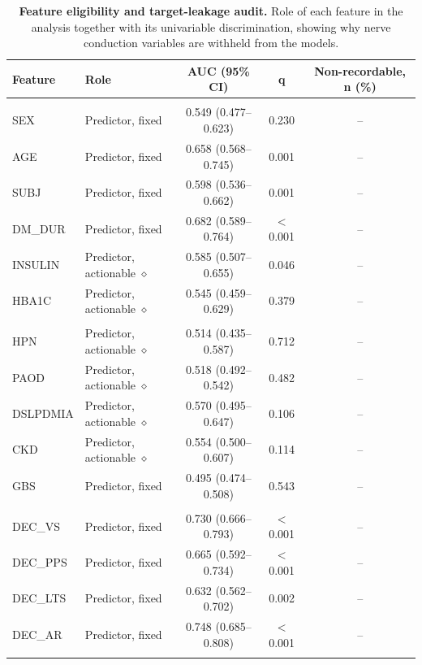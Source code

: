 \begin{table}[!ht]
\centering
\footnotesize
\caption{\textbf{Feature eligibility and target-leakage audit.} Role of each feature in the analysis together with its univariable discrimination, showing why nerve conduction variables are withheld from the models.}
\label{tab:eligibility}
\begin{tabular}{llccc}
\toprule
\textbf{Feature} & \textbf{Role} & \textbf{AUC (95\% CI)} & \textbf{q} & \textbf{Non-recordable, n (\%)} \\
\midrule
\addlinespace
\multicolumn{5}{l}{\textit{Profile}} \\
SEX & Predictor, fixed & 0.549 (0.477--0.623) & 0.230 & -- \\
AGE & Predictor, fixed & 0.658 (0.568--0.745) & 0.001 & -- \\
SUBJ & Predictor, fixed & 0.598 (0.536--0.662) & 0.001 & -- \\
DM\_DUR & Predictor, fixed & 0.682 (0.589--0.764) & $<$0.001 & -- \\
INSULIN & Predictor, actionable $\diamond$ & 0.585 (0.507--0.655) & 0.046 & -- \\
HBA1C & Predictor, actionable $\diamond$ & 0.545 (0.459--0.629) & 0.379 & -- \\
\addlinespace
\multicolumn{5}{l}{\textit{Comorbidity}} \\
HPN & Predictor, actionable $\diamond$ & 0.514 (0.435--0.587) & 0.712 & -- \\
PAOD & Predictor, actionable $\diamond$ & 0.518 (0.492--0.542) & 0.482 & -- \\
DSLPDMIA & Predictor, actionable $\diamond$ & 0.570 (0.495--0.647) & 0.106 & -- \\
CKD & Predictor, actionable $\diamond$ & 0.554 (0.500--0.607) & 0.114 & -- \\
GBS & Predictor, fixed & 0.495 (0.474--0.508) & 0.543 & -- \\
\addlinespace
\multicolumn{5}{l}{\textit{Neurological examination}} \\
DEC\_VS & Predictor, fixed & 0.730 (0.666--0.793) & $<$0.001 & -- \\
DEC\_PPS & Predictor, fixed & 0.665 (0.592--0.734) & $<$0.001 & -- \\
DEC\_LTS & Predictor, fixed & 0.632 (0.562--0.702) & 0.002 & -- \\
DEC\_AR & Predictor, fixed & 0.748 (0.685--0.808) & $<$0.001 & -- \\
\addlinespace
\multicolumn{5}{l}{\textit{MNSI}} \\

\end{tabular}
\end{table}
